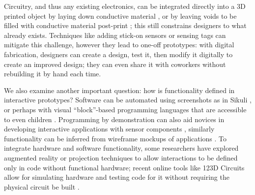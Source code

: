     Circuitry, and thus any existing electronics, can be integrated directly into a 3D printed object by laying down conductive material \cite{sells-reprap,voxel8}, or by leaving voids to be filled with conductive material post-print \cite{savage-sot}; this still constrains designers to what already exists. Techniques like adding stick-on sensors or sensing tags \cite{maynes-aminzade-eyepatch,yeo-stickear} can mitigate this challenge, however they lead to one-off prototypes: with digital fabrication, designers can create a design, test it, then modify it digitally to create an improved design; they can even share it with coworkers without rebuilding it by hand each time.
    
    We also examine another important question: how is functionality defined in interactive prototypes? Software can be automated using screenshots as in Sikuli \cite{yeh-sikuli}, or perhaps with visual ``block''-based programming languages that are accessible to even children \cite{resnick-scratch}. Programming by demonstration can also aid novices in developing interactive applications with sensor components \cite{hartmann-dtools}, similarly functionality can be inferred from wireframe mockups of applications \cite{li-framewire}. To integrate hardware and software functionality, some researchers have explored augmented reality \cite{nam-AR} or projection \cite{akaoka-displayobjects} techniques to allow interactions to be defined only in code without functional hardware; recent online tools like 123D Circuits allow for simulating hardware and testing code for it without requiring the physical circuit be built \cite{123dcircuits}.
    

    \cite{nam-sketchingtuis}
    \cite{sarik-tracebrush}
    \cite{macintyre-DART}
    \cite{klemmer-papiermache}
    \cite{fails-crayons}
    \cite{holman-sketchspace}
    \cite{doering-composition}
    \cite{hook-study}